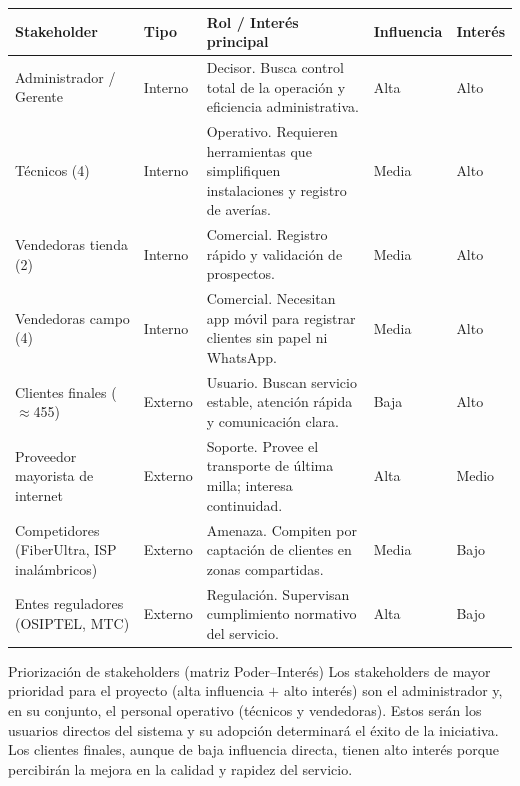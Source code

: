 \begin{center}
\label{tab:stakeholders}
\begin{tabularx}{\textwidth}{L{2.9cm} C{1.4cm} X C{1.5cm} C{1.3cm}}
\toprule
\textbf{Stakeholder} & \textbf{Tipo} & \textbf{Rol / Interés principal} & \textbf{Influencia} & \textbf{Interés} \\
\midrule
Administrador / Gerente & Interno &
Decisor. Busca control total de la operación y eficiencia administrativa. & Alta & Alto \\
Técnicos (4) & Interno &
Operativo. Requieren herramientas que simplifiquen instalaciones y registro de averías. & Media & Alto \\
Vendedoras tienda (2) & Interno &
Comercial. Registro rápido y validación de prospectos. & Media & Alto \\
Vendedoras campo (4) & Interno &
Comercial. Necesitan app móvil para registrar clientes sin papel ni WhatsApp. & Media & Alto \\
Clientes finales ($\approx$455) & Externo &
Usuario. Buscan servicio estable, atención rápida y comunicación clara. & Baja & Alto \\
Proveedor mayorista de internet & Externo &
Soporte. Provee el transporte de última milla; interesa continuidad. & Alta & Medio \\
Competidores (FiberUltra, ISP inalámbricos) & Externo &
Amenaza. Compiten por captación de clientes en zonas compartidas. & Media & Bajo \\
Entes reguladores (OSIPTEL, MTC) & Externo &
Regulación. Supervisan cumplimiento normativo del servicio. & Alta & Bajo \\
\bottomrule
\end{tabularx}
\end{center}

\begin{upeubox}{Priorización de stakeholders (matriz Poder--Interés)}
Los stakeholders de mayor prioridad para el proyecto (alta influencia $+$ alto
interés) son el administrador y, en su conjunto, el personal operativo (técnicos y
vendedoras). Estos serán los usuarios directos del sistema y su adopción
determinará el éxito de la iniciativa. Los clientes finales, aunque de baja
influencia directa, tienen alto interés porque percibirán la mejora en la calidad
y rapidez del servicio.
\end{upeubox}

